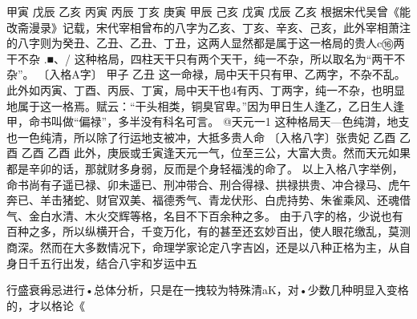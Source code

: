 甲寅	戊辰	乙亥
丙寅	丙辰	丁亥
庚寅	甲辰	己亥
戊寅	戊辰	乙亥
根据宋代吴曾《能改斋漫录》记载，宋代宰相曾布的八字为乙亥、丁亥、辛亥、己亥，此外宰相萧注的八字则为癸丑、乙丑、乙丑、丁丑，这两人显然都是属于这一格局的贵人c⑯两干不杂	.■、/\久
这种格局，四柱天干只有两个天干，纯一不杂，所以取名为“两干不杂”。
〔入格A字〕
甲子
乙丑
这一命禄，局中天干只有甲、乙两字，不杂不乱。此外如丙寅、丁酉、丙辰、丁寅，局中天干也4有丙、丁两字，纯一不杂，也明显地属于这一格焉。赋云：“干头相类，铜臭官卑。”因为甲日生人逢乙，乙日生人逢甲，命书叫做“偏禄”，多半没有科名可言。
@天元一1
这种格局天—色纯潸，地支也一色纯清，所以除了行运地支被冲，大抵多贵人命
〔入格八字〕张贵妃
乙酉
乙酉
乙酉
乙酉
此外，庚辰或壬寅逢天元一气，位至三公，大富大贵。然而天元如果都是辛卯的话，那就财多身弱，反而是个身轻福浅的命了。
以上入格八字举例，命书尚有子遥已禄、卯未遥已、刑冲带合、刑合得禄、拱禄拱贵、冲合禄马、虎午奔已、羊击猪蛇、财官双美、福德秀气、青龙伏形、白虎持势、朱雀乘风、还魂借气、金白水清、木火交辉等格，名目不下百余种之多。
由于八字的格，少说也有百种之多，所以纵横开合，千变万化，有的甚至还玄妙百出，使人眼花缴乱，莫测商深。然而在大多数情况下，命理学家论定八字吉凶，还是以八种正格为主，从自身日千五行出发，结合八宇和岁运中五

行盛衰爯忌进行•总体分析，只是在一拽较为特殊清aK，对•少数几种明显入变格的，才以格论《
